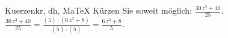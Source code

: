 \begin{MAufgabe}{Kuerzen}{kr, dh, MaTeX}
K\"urzen Sie soweit m\"oglich: $\frac{30\, z^3 + 40}{25}$.\\ 
\ifLsg\MLoesung
\quad $\frac{30\, z^3 + 40}{25}=\frac{(5)\cdot(6\, z^3 + 8)}{(5)\cdot(5)}=\frac{6\, z^3 + 8}{5}$.\else\relax\fi
 \end{MAufgabe}